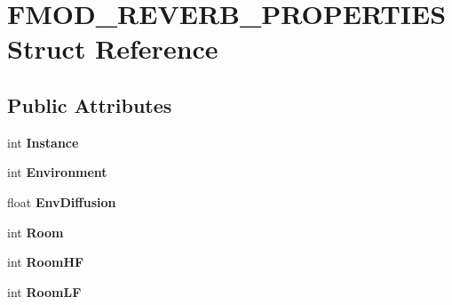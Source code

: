 \hypertarget{struct_f_m_o_d___r_e_v_e_r_b___p_r_o_p_e_r_t_i_e_s}{}\section{F\+M\+O\+D\+\_\+\+R\+E\+V\+E\+R\+B\+\_\+\+P\+R\+O\+P\+E\+R\+T\+I\+ES Struct Reference}
\label{struct_f_m_o_d___r_e_v_e_r_b___p_r_o_p_e_r_t_i_e_s}
\subsection*{Public Attributes}
\begin{DoxyCompactItemize}
\item 
int {\bfseries Instance}\hypertarget{struct_f_m_o_d___r_e_v_e_r_b___p_r_o_p_e_r_t_i_e_s_a41962641b26cd664ebe99b94a601e415}{}\label{struct_f_m_o_d___r_e_v_e_r_b___p_r_o_p_e_r_t_i_e_s_a41962641b26cd664ebe99b94a601e415}

\item 
int {\bfseries Environment}\hypertarget{struct_f_m_o_d___r_e_v_e_r_b___p_r_o_p_e_r_t_i_e_s_afae3003d52d86bd18cdc1621311f9196}{}\label{struct_f_m_o_d___r_e_v_e_r_b___p_r_o_p_e_r_t_i_e_s_afae3003d52d86bd18cdc1621311f9196}

\item 
float {\bfseries Env\+Diffusion}\hypertarget{struct_f_m_o_d___r_e_v_e_r_b___p_r_o_p_e_r_t_i_e_s_a694e98175479b3a7ff88b7cfb68f32f0}{}\label{struct_f_m_o_d___r_e_v_e_r_b___p_r_o_p_e_r_t_i_e_s_a694e98175479b3a7ff88b7cfb68f32f0}

\item 
int {\bfseries Room}\hypertarget{struct_f_m_o_d___r_e_v_e_r_b___p_r_o_p_e_r_t_i_e_s_aff2c5393b06ec1238cc8595d9b25d881}{}\label{struct_f_m_o_d___r_e_v_e_r_b___p_r_o_p_e_r_t_i_e_s_aff2c5393b06ec1238cc8595d9b25d881}

\item 
int {\bfseries Room\+HF}\hypertarget{struct_f_m_o_d___r_e_v_e_r_b___p_r_o_p_e_r_t_i_e_s_ae4a836dcc26f48773d51c6e40db286a4}{}\label{struct_f_m_o_d___r_e_v_e_r_b___p_r_o_p_e_r_t_i_e_s_ae4a836dcc26f48773d51c6e40db286a4}

\item 
int {\bfseries Room\+LF}\hypertarget{struct_f_m_o_d___r_e_v_e_r_b___p_r_o_p_e_r_t_i_e_s_ae07d419ed7e08ea376081b59798f7b1c}{}\label{struct_f_m_o_d___r_e_v_e_r_b___p_r_o_p_e_r_t_i_e_s_ae07d419ed7e08ea376081b59798f7b1c}


\end{DoxyCompactItemize}
